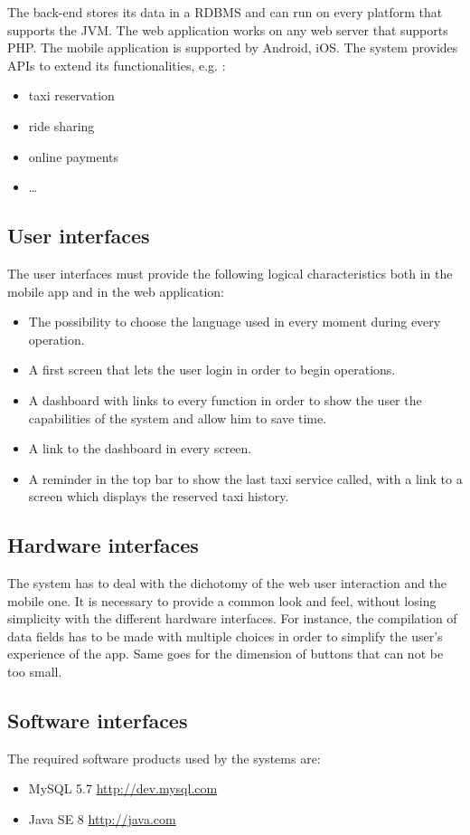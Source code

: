 The back-end stores its data in a RDBMS and  can run on every platform that supports the JVM.
The web application works on any web server that supports PHP. The mobile application is supported by Android, iOS. The system provides APIs to extend its functionalities, e.g. :
\begin{itemize}
\item taxi reservation
\item ride sharing
\item online payments
\item \ldots
\end{itemize}


\subsection{User interfaces}
The user interfaces must provide the following logical characteristics both in the mobile app and in the web application:
\begin{itemize}
\item The possibility to choose the language used in every moment during every operation.
\item A first screen that lets the user login in order to begin operations.
\item A dashboard with links to every function in order to show the user the capabilities of the system and allow him to save time. 
\item A link to the dashboard in every screen.
\item A reminder in the top bar to show the last taxi service called, with a link to a screen which displays the reserved taxi history.
\end{itemize}

\subsection{Hardware interfaces} 
The system has to deal with the dichotomy of the web user interaction and the mobile one. It is necessary to provide a common look and feel, without losing simplicity with the different hardware interfaces. For instance, the compilation of data fields has to be made with multiple choices in order to simplify the user's experience of the app. Same goes for the dimension of buttons that can not be too small.

\subsection{Software interfaces}
The required software products used by the systems are:
\begin{itemize}
\item MySQL 5.7   \url{http://dev.mysql.com}
\item Java SE 8   \url{http://java.com}
\end{itemize}
